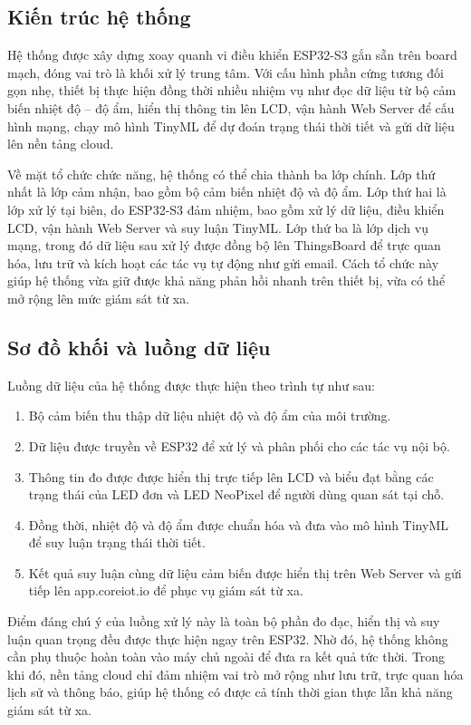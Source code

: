 \subsection{Kiến trúc hệ thống}
Hệ thống được xây dựng xoay quanh vi điều khiển ESP32-S3 gắn sẵn trên board mạch, đóng vai trò là khối xử lý trung tâm. Với cấu hình phần cứng tương đối gọn nhẹ, thiết bị thực hiện đồng thời nhiều nhiệm vụ như đọc dữ liệu từ bộ cảm biến nhiệt độ -- độ ẩm, hiển thị thông tin lên LCD, vận hành Web Server để cấu hình mạng, chạy mô hình TinyML để dự đoán trạng thái thời tiết và gửi dữ liệu lên nền tảng cloud.

Về mặt tổ chức chức năng, hệ thống có thể chia thành ba lớp chính. Lớp thứ nhất là lớp cảm nhận, bao gồm bộ cảm biến nhiệt độ và độ ẩm. Lớp thứ hai là lớp xử lý tại biên, do ESP32-S3 đảm nhiệm, bao gồm xử lý dữ liệu, điều khiển LCD, vận hành Web Server và suy luận TinyML. Lớp thứ ba là lớp dịch vụ mạng, trong đó dữ liệu sau xử lý được đồng bộ lên ThingsBoard để trực quan hóa, lưu trữ và kích hoạt các tác vụ tự động như gửi email. Cách tổ chức này giúp hệ thống vừa giữ được khả năng phản hồi nhanh trên thiết bị, vừa có thể mở rộng lên mức giám sát từ xa.

\subsection{Sơ đồ khối và luồng dữ liệu}
Luồng dữ liệu của hệ thống được thực hiện theo trình tự như sau:
\begin{enumerate}
    \item Bộ cảm biến thu thập dữ liệu nhiệt độ và độ ẩm của môi trường.
    \item Dữ liệu được truyền về ESP32 để xử lý và phân phối cho các tác vụ nội bộ.
    \item Thông tin đo được được hiển thị trực tiếp lên LCD và biểu đạt bằng các trạng thái của LED đơn và LED NeoPixel để người dùng quan sát tại chỗ.
    \item Đồng thời, nhiệt độ và độ ẩm được chuẩn hóa và đưa vào mô hình TinyML để suy luận trạng thái thời tiết.
    \item Kết quả suy luận cùng dữ liệu cảm biến được hiển thị trên Web Server và gửi tiếp lên app.coreiot.io để phục vụ giám sát từ xa.
\end{enumerate}

Điểm đáng chú ý của luồng xử lý này là toàn bộ phần đo đạc, hiển thị và suy luận quan trọng đều được thực hiện ngay trên ESP32. Nhờ đó, hệ thống không cần phụ thuộc hoàn toàn vào máy chủ ngoài để đưa ra kết quả tức thời. Trong khi đó, nền tảng cloud chỉ đảm nhiệm vai trò mở rộng như lưu trữ, trực quan hóa lịch sử và thông báo, giúp hệ thống có được cả tính thời gian thực lẫn khả năng giám sát từ xa.

